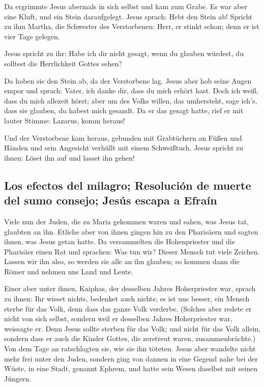  Da ergrimmte Jesus abermals in sich selbst und kam zum
Grabe. Es war aber eine Kluft, und ein Stein daraufgelegt.
 Jesus sprach: Hebt den Stein ab! Spricht zu ihm Martha,
die Schwester des Verstorbenen: Herr, er stinkt schon; denn er ist vier
Tage gelegen.

 Jesus spricht zu ihr: Habe ich dir nicht gesagt, wenn du
glauben würdest, du solltest die Herrlichkeit Gottes sehen?

 Da hoben sie den Stein ab, da der Verstorbene lag. Jesus
aber hob seine Augen empor und sprach: Vater, ich danke dir, dass du
mich erhört hast.  Doch ich weiß, dass du mich allezeit
hörst; aber um des Volks willen, das umhersteht, sage ich's, dass sie
glauben, du habest mich gesandt.  Da er das gesagt hatte,
rief er mit lauter Stimme: Lazarus, komm heraus!

 Und der Verstorbene kam heraus, gebunden mit Grabtüchern
an Füßen und Händen und sein Angesicht verhüllt mit einem Schweißtuch.
Jesus spricht zu ihnen: Löset ihn auf und lasset ihn gehen!

\hypertarget{los-efectos-del-milagro-resoluciuxf3n-de-muerte-del-sumo-consejo-jesuxfas-escapa-a-efrauxedn}{%
\subsection{Los efectos del milagro; Resolución de muerte del sumo
consejo; Jesús escapa a
Efraín}\label{los-efectos-del-milagro-resoluciuxf3n-de-muerte-del-sumo-consejo-jesuxfas-escapa-a-efrauxedn}}

 Viele nun der Juden, die zu Maria gekommen waren und
sahen, was Jesus tat, glaubten an ihn.  Etliche aber von
ihnen gingen hin zu den Pharisäern und sagten ihnen, was Jesus getan
hatte.  Da versammelten die Hohenpriester und die
Pharisäer einen Rat und sprachen: Was tun wir? Dieser Mensch tut viele
Zeichen.  Lassen wir ihn also, so werden sie alle an ihn
glauben; so kommen dann die Römer und nehmen uns Land und Leute.

 Einer aber unter ihnen, Kaiphas, der desselben Jahres
Hoherpriester war, sprach zu ihnen: Ihr wisset nichts, 
bedenket auch nichts; es ist uns besser, ein Mensch sterbe für das Volk,
denn dass das ganze Volk verderbe.  (Solches aber redete
er nicht von sich selbst, sondern weil er desselben Jahres Hoherpriester
war, weissagte er. Denn Jesus sollte sterben für das Volk;
 und nicht für das Volk allein, sondern dass er auch die
Kinder Gottes, die zerstreut waren, zusammenbrächte.) 
Von dem Tage an ratschlagten sie, wie sie ihn töteten. 
Jesus aber wandelte nicht mehr frei unter den Juden, sondern ging von
dannen in eine Gegend nahe bei der Wüste, in eine Stadt, genannt Ephrem,
und hatte sein Wesen daselbst mit seinen Jüngern.

